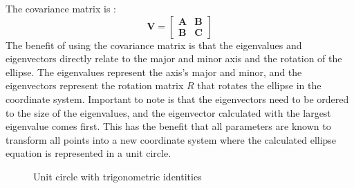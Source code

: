 The covariance matrix is :
\begin{equation}
    \mathbf{V} = \begin{bmatrix}
        \mathbf{A} & \mathbf{B} \\
        \mathbf{B} & \mathbf{C} 
    \label{covariance}
    \end{bmatrix}
\end{equation}
The benefit of using the covariance matrix is that the eigenvalues and eigenvectors directly relate to the major and minor axis and the rotation of the ellipse. The eigenvalues represent the axis's major and minor, and the eigenvectors represent the rotation matrix $R$ that rotates the ellipse in the coordinate system. Important to note is that the eigenvectors need to be ordered to the size of the eigenvalues, and the eigenvector calculated with the largest eigenvalue comes first. This has the benefit that all parameters are known to transform all points into a new coordinate system where the calculated ellipse equation is represented in a unit circle.


\begin{figure}[h]
    \centering
    \caption{Unit circle with trigonometric identities}
    \label{fig:unit_circle}
\end{figure}

